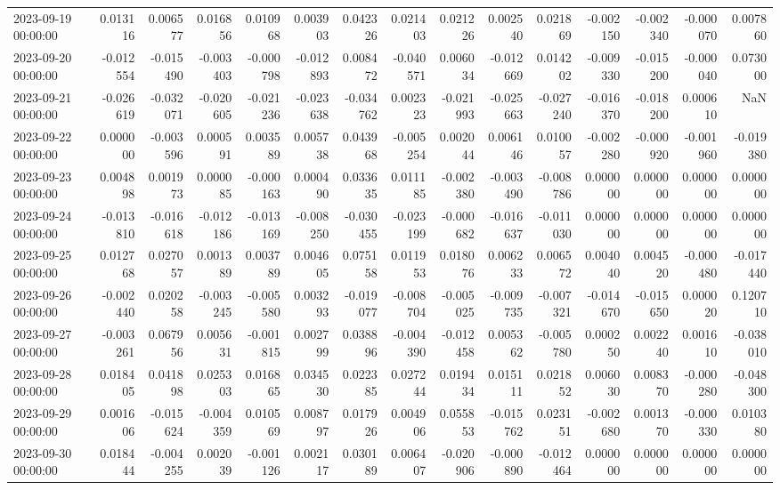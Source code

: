 \begin{tabular}{lrrrrrrrrrrrrrr}
2023-09-19 00:00:00 & 0.013116 & 0.006577 & 0.016856 & 0.010968 & 0.003903 & 0.042326 & 0.021403 & 0.021226 & 0.002540 & 0.021869 & -0.002150 & -0.002340 & -0.000070 & 0.007860 \\
2023-09-20 00:00:00 & -0.012554 & -0.015490 & -0.003403 & -0.000798 & -0.012893 & 0.008472 & -0.040571 & 0.006034 & -0.012669 & 0.014202 & -0.009330 & -0.015200 & -0.000040 & 0.073000 \\
2023-09-21 00:00:00 & -0.026619 & -0.032071 & -0.020605 & -0.021236 & -0.023638 & -0.034762 & 0.002323 & -0.021993 & -0.025663 & -0.027240 & -0.016370 & -0.018200 & 0.000610 & NaN \\
2023-09-22 00:00:00 & 0.000000 & -0.003596 & 0.000591 & 0.003589 & 0.005738 & 0.043968 & -0.005254 & 0.002044 & 0.006146 & 0.010057 & -0.002280 & -0.000920 & -0.001960 & -0.019380 \\
2023-09-23 00:00:00 & 0.004898 & 0.001973 & 0.000085 & -0.000163 & 0.000490 & 0.033635 & 0.011185 & -0.002380 & -0.003490 & -0.008786 & 0.000000 & 0.000000 & 0.000000 & 0.000000 \\
2023-09-24 00:00:00 & -0.013810 & -0.016618 & -0.012186 & -0.013169 & -0.008250 & -0.030455 & -0.023199 & -0.000682 & -0.016637 & -0.011030 & 0.000000 & 0.000000 & 0.000000 & 0.000000 \\
2023-09-25 00:00:00 & 0.012768 & 0.027057 & 0.001389 & 0.003789 & 0.004605 & 0.075158 & 0.011953 & 0.018076 & 0.006233 & 0.006572 & 0.004040 & 0.004520 & -0.000480 & -0.017440 \\
2023-09-26 00:00:00 & -0.002440 & 0.020258 & -0.003245 & -0.005580 & 0.003293 & -0.019077 & -0.008704 & -0.005025 & -0.009735 & -0.007321 & -0.014670 & -0.015650 & 0.000020 & 0.120710 \\
2023-09-27 00:00:00 & -0.003261 & 0.067956 & 0.005631 & -0.001815 & 0.002799 & 0.038896 & -0.004390 & -0.012458 & 0.005362 & -0.005780 & 0.000250 & 0.002240 & 0.001610 & -0.038010 \\
2023-09-28 00:00:00 & 0.018405 & 0.041898 & 0.025303 & 0.016865 & 0.034530 & 0.022385 & 0.027244 & 0.019434 & 0.015111 & 0.021852 & 0.006030 & 0.008370 & -0.000280 & -0.048300 \\
2023-09-29 00:00:00 & 0.001606 & -0.015624 & -0.004359 & 0.010569 & 0.008797 & 0.017926 & 0.004906 & 0.055853 & -0.015762 & 0.023151 & -0.002680 & 0.001370 & -0.000330 & 0.010380 \\
2023-09-30 00:00:00 & 0.018444 & -0.004255 & 0.002039 & -0.001126 & 0.002117 & 0.030189 & 0.006407 & -0.020906 & -0.000890 & -0.012464 & 0.000000 & 0.000000 & 0.000000 & 0.000000 \\

\end{tabular}
